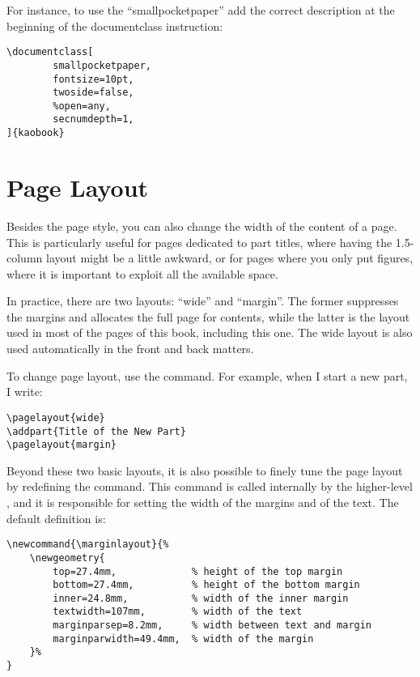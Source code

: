 For instance, to use the \enquote{smallpocketpaper} add the correct 
description at the beginning of the documentclass instruction:
\begin{lstlisting}
\documentclass[
		smallpocketpaper,
		fontsize=10pt,
		twoside=false,
		%open=any,
		secnumdepth=1,
]{kaobook}
\end{lstlisting}

\section{Page Layout}

Besides the page style, you can also change the width of the content of 
a page. This is particularly useful for pages dedicated to part titles, 
where having the 1.5-column layout might be a little awkward, or for 
pages where you only put figures, where it is important to exploit all 
the available space.

In practice, there are two layouts: \enquote{wide} and \enquote{margin}. 
The former suppresses the margins and allocates the full page for 
contents, while the latter is the layout used in most of the pages of 
this book, including this one. The wide layout is also used 
automatically in the front and back matters.


To change page layout, use the  command. For 
example, when I start a new part, I write:

\begin{lstlisting}
\pagelayout{wide}
\addpart{Title of the New Part}
\pagelayout{margin}
\end{lstlisting}

Beyond these two basic layouts, it is also possible to finely tune the 
page layout by redefining the  command. This 
command is called internally by the higher-level , 
and it is responsible for setting the width of the margins and of the 
text. The default definition is:

\begin{lstlisting}
\newcommand{\marginlayout}{%
	\newgeometry{
		top=27.4mm,				% height of the top margin
		bottom=27.4mm,			% height of the bottom margin
		inner=24.8mm,			% width of the inner margin
		textwidth=107mm,		% width of the text
		marginparsep=8.2mm,		% width between text and margin
		marginparwidth=49.4mm,	% width of the margin
	}%
}
\end{lstlisting}

